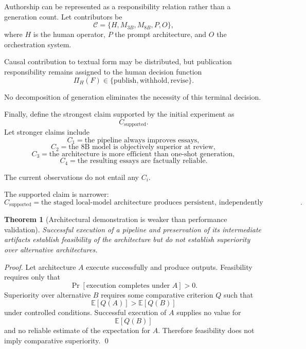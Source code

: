 \documentclass[11pt]{article}
\newtheorem{theorem}[definition]{Theorem}
\begin{document}
Authorship can be represented as a responsibility relation rather than a generation count. Let contributors be
\[
    \mathcal{C}
    =
    \{
    H,
    M_{3B},
    M_{8B},
    P,
    O
    \},
\]
where \(H\) is the human operator, \(P\) the prompt architecture, and \(O\) the orchestration system.

Causal contribution to textual form may be distributed, but publication responsibility remains assigned to the human decision function
\[
    \Pi_H(F)\in\{\text{publish},\text{withhold},\text{revise}\}.
\]

No decomposition of generation eliminates the necessity of this terminal decision.

Finally, define the strongest claim supported by the initial experiment as
\[
    C_{\mathrm{supported}}.
\]
Let stronger claims include
\[
    C_1=\text{the pipeline always improves essays},
\]
\[
    C_2=\text{the 8B model is objectively superior at review},
\]
\[
    C_3=\text{the architecture is more efficient than one-shot generation},
\]
\[
    C_4=\text{the resulting essays are factually reliable}.
\]

The current observations do not entail any \(C_i\).

The supported claim is narrower:
\[
    C_{\mathrm{supported}}
    =
    \text{the staged local-model architecture produces persistent,
    independently inspectable artifacts that permit diagnosis and repair
    to be evaluated as distinct operations}.
\]

\begin{theorem}[Architectural demonstration is weaker than performance validation]
Successful execution of a pipeline and preservation of its intermediate artifacts establish feasibility of the architecture but do not establish superiority over alternative architectures.
\end{theorem}

\begin{proof}
Let architecture \(A\) execute successfully and produce outputs. Feasibility requires only that
\[
    \Pr[\text{execution completes under }A]>0.
\]
Superiority over alternative \(B\) requires some comparative criterion \(Q\) such that
\[
    \mathbb{E}[Q(A)]>\mathbb{E}[Q(B)]
\]
under controlled conditions. Successful execution of \(A\) supplies no value for
\[
    \mathbb{E}[Q(B)]
\]
and no reliable estimate of the expectation for \(A\). Therefore feasibility does not imply comparative superiority. \qed
\end{proof}
\end{document}
